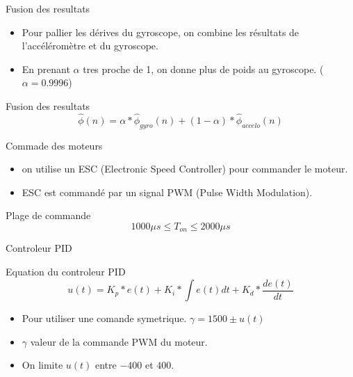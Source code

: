 \documentclass{beamer}
\begin{document}
\begin{frame}{Fusion des resultats}
	\begin{itemize}
		\item Pour pallier les dérives du gyroscope, on combine les résultats de l'accéléromètre et du gyroscope.
		\item En prenant $\alpha$ tres proche de 1, on donne plus de poids au gyroscope. ($\alpha = 0.9996$)
	\end{itemize}
	\begin{block}{Fusion des resultats}
		\begin{equation*}
			\hat{\phi}(n) = \alpha * \hat{\phi}_{gyro}(n) + (1 - \alpha) * \hat{\phi}_{accelo}(n)
		\end{equation*}
	\end{block}
\end{frame}


\begin{frame}{Commade des moteurs}
	\begin{itemize}
		\item on utilise un ESC (Electronic Speed Controller) pour commander le moteur.
		\item ESC est commandé par un signal PWM (Pulse Width Modulation).
	\end{itemize}
	\begin{block}{Plage de commande}
		\begin{equation*}
				1000\mu s \leq T_{on} \leq 2000\mu s
		\end{equation*}
	\end{block}
\end{frame}

\begin{frame}{Controleur PID}
	\begin{block}{Equation du controleur PID}
		\begin{equation*}
			u(t) = K_p * e(t) + K_i * \int e(t) dt + K_d * \frac{de(t)}{dt}
		\end{equation*}
	\end{block}
	\begin{itemize}
		\item Pour utiliser une comande symetrique. $\gamma = 1500 \pm u(t)$
		\item $\gamma$ valeur de la commande PWM du moteur.
		\item On limite $u(t)$ entre $-400$ et $400$.
	\end{itemize}
\end{frame}
\end{document}
